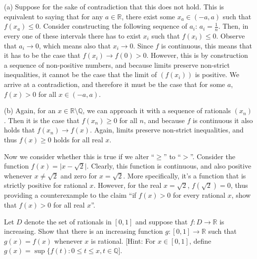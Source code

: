 \begin{solution}

    (a) Suppose for the sake of contradiction that this does not hold. 
    This is equivalent to saying that for any $a \in \mathbb{R}$, there exist some $x_a \in (-a, a)$ such that $f(x_a) \leq 0$. Consider constructing the following sequence of $a_i$: $a_i = \frac{1}{n}$. 
    Then, in every one of these intervals there has to exist $x_i$ such that $f(x_i) \leq 0$. 
    Observe that $a_i \rightarrow 0$, which means also that $x_i \rightarrow 0$. Since $f$ is continuous, this means that it has to be the case that $f(x_i) \rightarrow f(0) > 0$. However, this is by construction a sequence of non-positive numbers, and because limits preserve non-strict inequalities, it cannot be the case that the limit of $(f(x_i))$ is positive. 
    We arrive at a contradiction, and therefore it must be the case that for some $a$, $f(x) > 0$ for all $x \in (-a, a)$.

    (b) Again, for an $x \in \mathbb{R} \setminus \mathbb{Q}$, we can approach it with a sequence of rationals $(x_n)$. 
    Then it is the case that $f(x_n) \geq 0$ for all $n$, and because $f$ is continuous it also holds that $f(x_n) \rightarrow f(x)$. 
    Again, limits preserve non-strict inequalities, and thus $f(x) \geq 0$ holds for all real $x$.

    Now we consider whether this is true if we alter ``$\geq$'' to ``$>$''. Consider the function $f(x) = \lvert x - \sqrt{2} \rvert$. 
    Clearly, this function is continuous, and also positive whenever $x \neq \sqrt{2}$ and zero for $x = \sqrt{2}$. 
    More specifically, it's a function that is strictly positive for rational $x$. However, for the real $x = \sqrt{2}$, $f(\sqrt{2}) = 0$, thus providing a counterexample to the claim ``if $f(x) > 0$ for every rational $x$, show that $f(x) > 0$ for all real $x$''.
\end{solution}

\begin{exercise}{50}
    Let $D$ denote the set of rationals in $[0, 1]$ and suppose that $f: D \rightarrow \mathbb{R}$ is increasing. 
    Show that there is an increasing function $g: [0, 1] \rightarrow \mathbb{R}$ such that $g(x) = f(x)$ whenever $x$ is rational. 
    [Hint: For $x \in [0, 1]$, define $g(x) = \sup\{f(t) : 0 \leq t \leq x, t \in \mathbb{Q}$].
\end{exercise}

